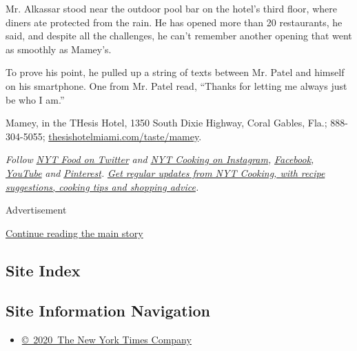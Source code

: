 Mr. Alkassar stood near the outdoor pool bar on the hotel's third floor,
where diners ate protected from the rain. He has opened more than 20
restaurants, he said, and despite all the challenges, he can't remember
another opening that went as smoothly as Mamey's.

To prove his point, he pulled up a string of texts between Mr. Patel and
himself on his smartphone. One from Mr. Patel read, ``Thanks for letting
me always just be who I am.''

Mamey, in the THesis Hotel, 1350 South Dixie Highway, Coral Gables,
Fla.; 888-304-5055;
\href{https://www.thesishotelmiami.com/taste/mamey/}{thesishotelmiami.com/taste/mamey}.

\emph{Follow} \href{https://twitter.com/nytfood}{\emph{NYT Food on
Twitter}} \emph{and}
\href{https://www.instagram.com/nytcooking/}{\emph{NYT Cooking on
Instagram}}\emph{,}
\href{https://www.facebookcorewwwi.onion/nytcooking/}{\emph{Facebook}}\emph{,}
\href{https://www.youtube.com/nytcooking}{\emph{YouTube}} \emph{and}
\href{https://www.pinterest.com/nytcooking/}{\emph{Pinterest}}\emph{.}
\href{https://www.nytimes3xbfgragh.onion/newsletters/cooking}{\emph{Get
regular updates from NYT Cooking, with recipe suggestions, cooking tips
and shopping advice}}\emph{.}

Advertisement

\protect\hyperlink{after-bottom}{Continue reading the main story}

\hypertarget{site-index}{%
\subsection{Site Index}\label{site-index}}

\hypertarget{site-information-navigation}{%
\subsection{Site Information
Navigation}\label{site-information-navigation}}

\begin{itemize}
\tightlist
\item
  \href{https://help.nytimes3xbfgragh.onion/hc/en-us/articles/115014792127-Copyright-notice}{©~2020~The
  New York Times Company}
\end{itemize}

